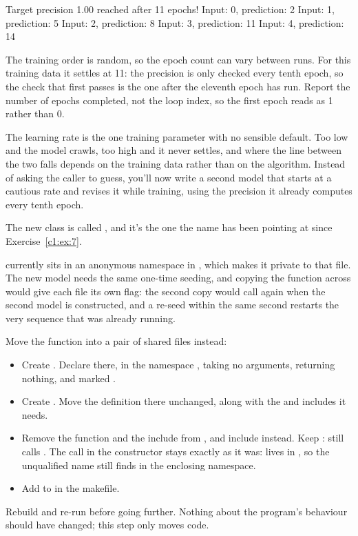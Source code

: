 \begin{console}
Target precision 1.00 reached after 11 epochs!
Input: 0, prediction: 2
Input: 1, prediction: 5
Input: 2, prediction: 8
Input: 3, prediction: 11
Input: 4, prediction: 14
\end{console}

\noindent The training order is random, so the epoch count can vary between runs. For this
training data it settles at 11: the precision is only checked every tenth epoch, so the check that
first passes is the one after the eleventh epoch has run. Report the number of epochs completed, not
the loop index, so the first epoch reads as 1 rather than 0.

\label{c2:set:3}
The learning rate is the one training parameter with no sensible default. Too low and the model
crawls, too high and it never settles, and where the line between the two falls depends on the
training data rather than on the algorithm. Instead of asking the caller to guess, you'll now write
a second model that starts at a cautious rate and revises it while training, using the precision it
already computes every tenth epoch.

The new class is called , and it's the one the  name has been pointing at
since Exercise~\ref{c1:ex:7}.

\label{c2:ex:10}
 currently sits in an anonymous namespace in , which makes it
private to that file. The new model needs the same one-time seeding, and copying the function across
would give each file its own  flag: the second copy would call 
again when the second model is constructed, and a re-seed within the same second restarts the very
sequence that was already running.

Move the function into a pair of shared files instead:
\begin{itemize}
  \item Create . Declare  there, in the namespace
    , taking no arguments, returning nothing, and marked .
  \item Create . Move the definition there unchanged, along with the
     and  includes it needs.
  \item Remove the function and the  include from , and include
     instead. Keep :  still calls
    . The call in the constructor stays exactly as it was:  lives in
    , so the unqualified name still finds  in the
    enclosing namespace.
  \item Add  to  in the makefile.
\end{itemize}
Rebuild and re-run before going further. Nothing about the program's behaviour should have changed;
this step only moves code.


